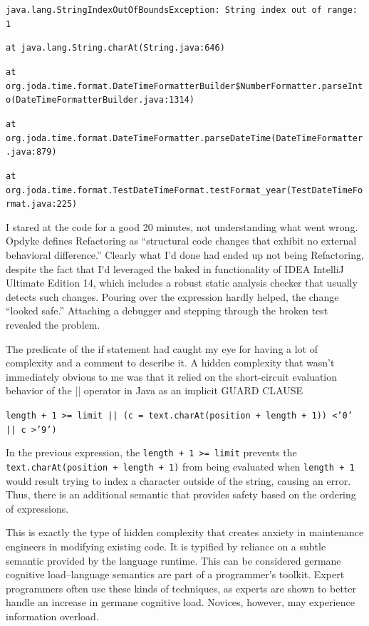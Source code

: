 \texttt{java.lang.StringIndexOutOfBoundsException: String index out of range: 1}

\hspace{\parindent} \texttt{at java.lang.String.charAt(String.java:646)}

\hspace{\parindent} \texttt{at org.joda.time.format.DateTimeFormatterBuilder\$NumberFormatter.parseInto(DateTimeFormatterBuilder.java:1314)}

\hspace{\parindent} \texttt{at org.joda.time.format.DateTimeFormatter.parseDateTime(DateTimeFormatter.java:879)}

\hspace{\parindent} \texttt{at org.joda.time.format.TestDateTimeFormat.testFormat\_year(TestDateTimeFormat.java:225)}

I stared at the code for a good 20 minutes, not understanding what went wrong. Opdyke defines Refactoring as “structural code changes that exhibit no external behavioral difference.” Clearly what I’d done had ended up not being Refactoring, despite the fact that I’d leveraged the baked in functionality of IDEA IntelliJ Ultimate Edition 14, which includes a robust static analysis checker that usually detects such changes. Pouring over the expression hardly helped, the change “looked safe.” Attaching a debugger and stepping through the broken test revealed the problem.

The predicate of the if statement had caught my eye for having a lot of complexity and a comment to describe it. A hidden complexity that wasn’t immediately obvious to me was that it relied on the short-circuit evaluation behavior of the || operator in Java as an implicit GUARD CLAUSE

\texttt{length + 1 \textgreater= limit || (c = text.charAt(position + length + 1)) \textless '0' || c \textgreater '9')}

In the previous expression, the \texttt{length + 1 \textgreater= limit} prevents the \texttt{text.charAt(position + length + 1)} from being evaluated when \texttt{length + 1} would result trying to index a character outside of the string, causing an error. Thus, there is an additional semantic that provides safety based on the ordering of expressions.

This is exactly the type of hidden complexity that creates anxiety in maintenance engineers in modifying existing code. It is typified by reliance on a subtle semantic provided by the language runtime. This can be considered germane cognitive load--language semantics are part of a programmer’s toolkit. Expert programmers often use these kinds of techniques, as experts are shown to better handle an increase in germane cognitive load. Novices, however, may experience information overload.

